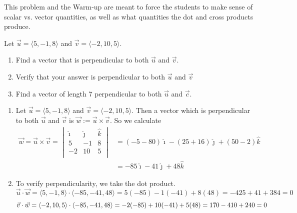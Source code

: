 \documentclass[handout]{ximera}
\begin{document}
\begin{instructorNotes}
This problem and the Warm-up are meant to force the students to make sense of scalar vs. vector quantities, as well as what quantities the dot and cross products produce.
\end{instructorNotes}







\begin{problem} 
Let $\vec{u} =\langle 5,-1,8 \rangle$ and $\vec{v} = \langle -2,10,5 \rangle$.
\begin{enumerate}
\item Find a vector that is perpendicular to both $\vec{u}$ and $\vec{v}$.  
\item Verify that your answer is perpendicular to both $\vec{u}$ and $\vec{v}$
\item Find a vector of length 7 perpendicular to both $\vec{u}$ and $\vec{c}$.
\end{enumerate}

	\begin{freeResponse}
	\begin{enumerate}
	\item 
	Let $\vec{u} = \langle 5,-1,8 \rangle$ and $\vec{v} = \langle -2,10,5 \rangle$.
	Then a vector which is perpendicular to both $\vec{u}$ and $\vec{v}$ is $\vec{w} := \vec{u} \times \vec{v}$.  
	So we calculate
		\begin{align*}
		\vec{w} = \vec{u} \times \vec{v} = 
		\begin{vmatrix}
		\hat{\imath}	&	\hat{\jmath}	&	\hat{k}	\\
		5		&	-1		&	8		\\
		-2		&	10		&	5		\\
		\end{vmatrix}
		&= (-5 - 80) \hat{\imath} - (25 + 16) \hat{\jmath} + (50 - 2) \hat{k}  \\
		&= -85 \hat{\imath} -41 \hat{\jmath} + 48 \hat{k}
		\end{align*}
		
	\item To verify perpendicularity, we take the dot product.\\
	\[
	\vec{u} \cdot \vec{w} = \langle 5,-1,8 \rangle \cdot \langle -85, -41, 48 \rangle = 5(-85)-1(-41)+8(48) = -425 +41 + 384 = 0 
	\]
	\[
	\vec{v} \cdot \vec{w} = \langle -2,10,5 \rangle \cdot \langle -85, -41, 48 \rangle = -2(-85) +10(-41)+5(48) = 170 -410 + 240 = 0 \\
	\]	
		

\end{enumerate}
\end{freeResponse}
\end{problem}
\end{document}
